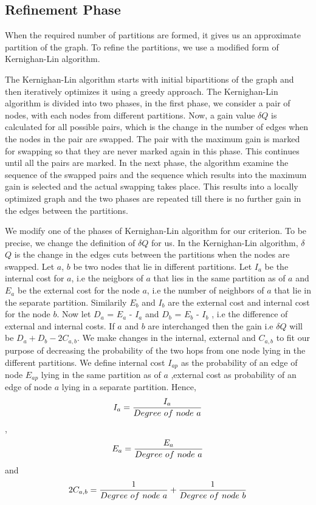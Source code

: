 \documentclass[letterpaper]{article}
\begin{document}
 
\subsection{Refinement Phase}
When the required number of partitions are formed, it gives us an approximate
partition of the graph. To refine the partitions, we use a modified form of
Kernighan-Lin algorithm\cite{22}.


    The Kernighan-Lin algorithm starts with initial bipartitions of the graph
and then iteratively optimizes it using a greedy approach. The Kernighan-Lin
algorithm is divided into two phases, in the first phase, we consider a pair of
nodes, with each nodes from different partitions. Now, a gain value $\delta$$Q$
is calculated for all possible pairs, which is the change in the number of
edges when the nodes in the pair are swapped. The pair with the maximum  gain
is marked for swapping so that they are never marked again in this phase. This
continues until all the pairs are marked. In the next phase, the algorithm
examine the sequence of the swapped pairs and the sequence which results into
the maximum gain is selected and the actual swapping takes place. This results
into a locally optimized graph and the two phases are repeated till there is no
further gain in the edges between the partitions.


    We modify one of the phases of  Kernighan-Lin algorithm for our criterion.
To be precise, we change the definition of $\delta$$Q$ for us. In the
Kernighan-Lin algorithm, $\delta$$Q$ is the change in the edges cuts between
the partitions when the nodes are swapped. Let $a$, $b$ be two nodes that lie
in different partitions. Let $I_a$ be the internal cost for $a$, i.e the
neigbors of $a$ that lies in the same partition as of $a$ and  $E_a$ be the
external cost for the node $a$, i.e the number of neighbors of $a$ that lie in
the separate partition. Similarily $E_b$ and $I_b$ are the external cost and
internal cost for the node $b$. Now let $D_a$ = $E_a$ - $I_a$ and $D_b$ = $E_b$
- $I_b$ , i.e the difference of external and internal costs. If $a$ and $b$ are
interchanged then the gain i.e $\delta$$Q$ will be $D_a + D_b -2C_{a,b}$. We
make changes in the internal, external and $C_{a,b}$ to fit our purpose of
decreasing the probability of the two hops from one node lying in the different
partitions. We define internal cost $I_{ap}$ as the probability of an edge of
node $E_{ap}$ lying in the same partition as of $a$ ,external cost as
probability of an edge of node $a$ lying in a separate partition. Hence,\\
\begin{displaymath}I_{a}=\frac{I_a}{Degree\ of\ node\ a }\\\end{displaymath},
\\\begin{displaymath}E_{a}=\frac{E_a}{Degree\ of\ node\ a}\\\end{displaymath}
and\\ \begin{displaymath}2C_{a,b}=\frac{1}{Degree\ of\ node\
a}+\frac{1}{Degree\ of\ node\ b}\\\end{displaymath}
\end{document}
